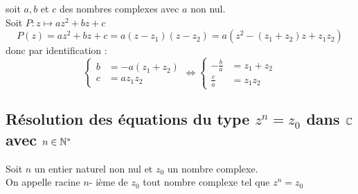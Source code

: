 \begin{dem}
    soit \(a,b\) et \(c\) des nombres complexes avec \(a\) non nul. \\
    Soit \(P:z\mapsto az^2+bz+c\) 
    \[P(z) = az^2+bz+c = a(z-z_1)(z-z_2) = a(z^2-(z_1+z_2)z+z_1z_2)\]
    donc par identification : 
    \[
    \begin{cases}
        b &=-a(z_1+z_2) \\
        c &= az_1z_2 
    \end{cases} \iff\begin{cases}
        -\frac{b}{a} &=z_1+z_2 \\
        \frac{c}{a} &= z_1z_2 
    \end{cases} 
    \]
\end{dem}

\subsection{Résolution des équations du type \(z^n = z_0\) dans \(\mathbb{C}\) avec \(n\in \mathbb{N}^*\)}

\begin{defi}
    Soit \(n\) un entier naturel non nul et \(z_0\) un nombre complexe. \\
    On appelle racine \(n\)- ième de \(z_0\) tout nombre complexe tel que \(z^n = z_0\)
\end{defi}

